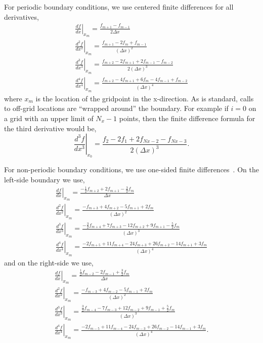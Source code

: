 \documentclass[journal=mamobx,manuscript=suppinfo]{achemso}
\begin{document}
For periodic boundary conditions, we use centered finite differences for all derivatives,
\begin{gather}
\left . \frac{df}{dx} \right |_{x_{m}} = \frac{f_{m+1} - f_{m-1}}{2 \Delta x} \\
\left . \frac{d^{2}f}{dx^{2}} \right |_{x_{m}} = \frac{f_{m+1} - 2 f_{m} + f_{m-1}}{(\Delta x)^{2}} \\
\left . \frac{d^{3}f}{dx^{3}} \right |_{x_{m}} = \frac{f_{m+2} - 2 f_{m+1} + 2 f_{m-1} - f_{m-2}}{2 (\Delta x)^{3}} \\
\left . \frac{d^{4}f}{dx^{4}} \right |_{x_{m}} = \frac{f_{m+2} - 4 f_{m+1} + 6 f_{m} - 4 f_{m-1} + f_{m-2}}{(\Delta x)^{4}}
\end{gather}
where $x_{m}$ is the location of the gridpoint in the x-direction.
As is standard, calls to off-grid locations are ``wrapped around'' the boundary.
For example if $i = 0$ on a grid with an upper limit of $N_{x}-1$ points, then the finite difference formula for the third derivative would be,
\begin{equation}
\left . \frac{d^{3}f}{dx^{3}} \right |_{x_{0}} = \frac{f_{2} - 2 f_{1} + 2 f_{Nx-2} - f_{Nx-3}}{2 (\Delta x)^{3}}\textrm{.}
\end{equation}

For non-periodic boundary conditions, we use one-sided finite differences~\cite{Fornberg1988}.
On the left-side boundary we use,
\begin{gather}
\left . \frac{df}{dx} \right |_{x_{m}} = \frac{-\frac{1}{2} f_{m+2} + 2 f_{m+1} - \frac{3}{2} f_{m}}{\Delta x} \\
\left . \frac{d^{2}f}{dx^{2}} \right |_{x_{m}} = \frac{-f _{m+3} + 4 f_{m+2} - 5 f_{m+1} + 2 f_{m}}{(\Delta x)^{2}} \\
\left . \frac{d^{3}f}{dx^{3}} \right |_{x_{m}} = \frac{-\frac{3}{2} f_{m+4} + 7 f_{m+3} - 12 f_{m+2} + 9 f_{m+1} - \frac{5}{2} f_{m}}{(\Delta x)^{3}} \\
\left . \frac{d^{4}f}{dx^{4}} \right |_{x_{m}} = \frac{-2 f_{m+5}  + 11 f_{m+4} - 24 f_{m+3} + 26 f_{m+2} - 14 f_{m+1} + 3 f_{m}}{(\Delta x)^{4}}
\end{gather}
and on the right-side we use,
\begin{gather}
\left . \frac{df}{dx} \right |_{x_{m}} = \frac{\frac{1}{2} f_{m-2} - 2 f_{m-1} + \frac{3}{2} f_{m}}{\Delta x} \\
\left . \frac{d^{2}f}{dx^{2}} \right |_{x_{m}} = \frac{-f _{m-3} + 4 f_{m-2} - 5 f_{m-1} + 2 f_{m}}{(\Delta x)^{2}} \\
\left . \frac{d^{3}f}{dx^{3}} \right |_{x_{m}} = \frac{\frac{3}{2} f_{m-4} - 7 f_{m-3} + 12 f_{m-2} + 9 f_{m-1} + \frac{5}{2} f_{m}}{(\Delta x)^{3}} \\
\left . \frac{d^{4}f}{dx^{4}} \right |_{x_{m}} = \frac{-2 f_{m-5}  + 11 f_{m-4} - 24 f_{m-3} + 26 f_{m-2} - 14 f_{m-1} + 3 f_{m}}{(\Delta x)^{4}}
\textrm{.}
\end{gather}
\end{document}
